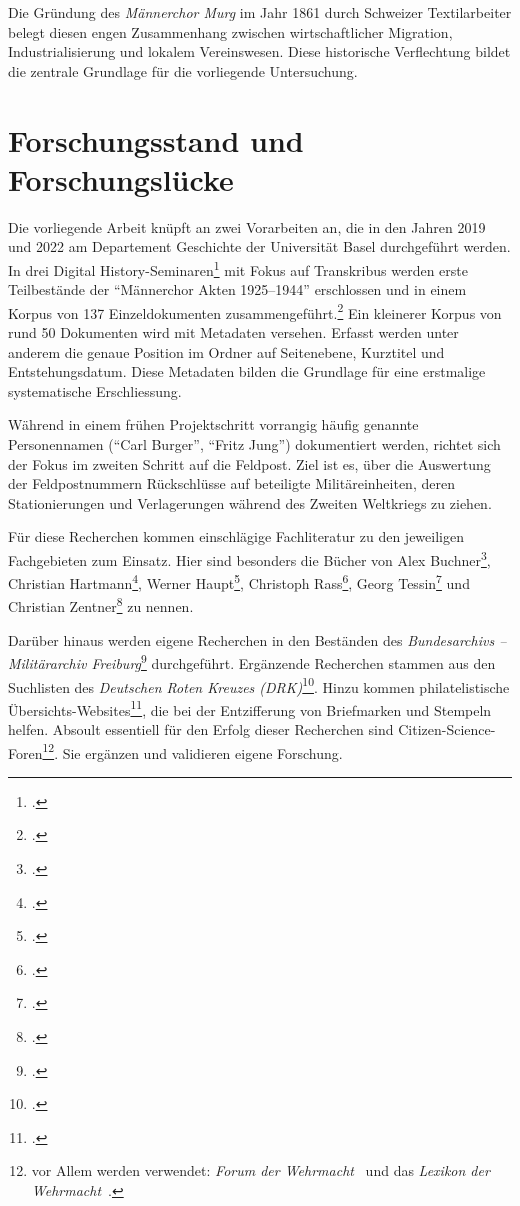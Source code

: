 \documentclass[12pt, a4paper, ngerman, bidi=default]{article}
\let\cite\footcite
\begin{document}
Die Gründung des \textit{Männerchor Murg} im Jahr 1861 durch Schweizer Textilarbeiter belegt diesen engen Zusammenhang 
zwischen wirtschaftlicher Migration, Industrialisierung und lokalem Vereinswesen. Diese historische Verflechtung bildet 
die zentrale Grundlage für die vorliegende Untersuchung.


  

\newpage
\section{Forschungsstand und Forschungslücke}\label{subsec:forschungsstand}

Die vorliegende Arbeit knüpft an zwei Vorarbeiten an, die in den Jahren 2019 und 2022 am Departement Geschichte der Universität Basel durchgeführt
werden. In drei Digital History-Seminaren\cite[vgl.][]{hodel_machine_2019, serif_digital_2019, serif_von_2022} mit Fokus auf Transkribus werden erste Teilbestände der \enquote{Männerchor Akten 1925--1944} erschlossen und in einem Korpus
von 137 Einzeldokumenten zusammengeführt.\cite[vgl.][]{burkhardt_feldpost_2022}
Ein kleinerer Korpus von rund 50 Dokumenten wird mit Metadaten versehen. Erfasst werden unter anderem die genaue Position im Ordner auf Seitenebene, 
Kurztitel und Entstehungsdatum. Diese Metadaten bilden die Grundlage für eine erstmalige systematische Erschliessung.

Während in einem frühen Projektschritt vorrangig häufig genannte Personennamen (\enquote{Carl Burger}, \enquote{Fritz Jung})
dokumentiert werden, richtet sich der Fokus im zweiten Schritt auf die Feldpost. Ziel ist es, über die Auswertung der Feldpostnummern
Rückschlüsse auf beteiligte Militäreinheiten, deren Stationierungen und Verlagerungen während des Zweiten Weltkriegs zu ziehen.

Für diese Recherchen kommen einschlägige Fachliteratur zu den jeweiligen Fachgebieten zum Einsatz. 
Hier sind besonders die Bücher von Alex Buchner\cite[vgl.][]{buchner_handbuch_1989}, Christian Hartmann\cite[vgl.][]{hartmann_wehrmacht_2010}, 
Werner Haupt\cite[vgl.][]{haupt_buch_1982}, Christoph Rass\cite[vgl.][]{rass_deutsche_2009}, Georg Tessin\cite[vgl.][]{tessin_verbande_1977} 
und Christian Zentner\cite[vgl.][]{zentner_illustrierte_1983} zu nennen.

Darüber hinaus werden eigene Recherchen in den Beständen des \textit{Bundesarchivs – Militärarchiv Freiburg}\cite{hollmann_freiburg_2025} durchgeführt. Ergänzende Recherchen 
stammen aus den Suchlisten des \textit{Deutschen Roten Kreuzes (DRK)}\cite{reuter_drk_2025}. Hinzu kommen philatelistische Übersichts-Websites\cite{noauthor_feldpost_nodate}, 
die bei der Entzifferung von Briefmarken und Stempeln helfen.
Absoult essentiell für den Erfolg dieser Recherchen sind Citizen-Science-Foren\footnote{vor Allem werden verwendet: 
\textit{Forum der Wehrmacht}~\parencite{hermans_forum_nodate} und das \textit{Lexikon der Wehrmacht}~\parencite{altenburger_lexikon_nodate}.}. Sie ergänzen und validieren eigene Forschung.
\end{document}
